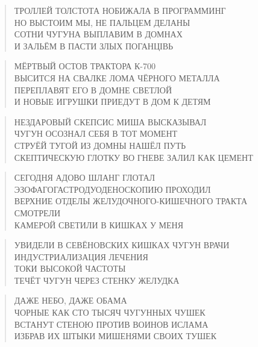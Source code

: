 \poemtitle{***}
\begin{verse}
ТРОЛЛЕЙ ТОЛСТОТА НОБИЖАЛА В ПРОГРАММИНГ\\
НО ВЫСТОИМ МЫ, НЕ ПАЛЬЦЕМ ДЕЛАНЫ\\
СОТНИ ЧУГУНА ВЫПЛАВИМ В ДОМНАХ\\
И ЗАЛЬЁМ В ПАСТИ ЗЛЫХ ПОГАНЦІВЬ
\end{verse}

\poemtitle{***}
\begin{verse}
МЁРТВЫЙ ОСТОВ ТРАКТОРА К-700\\
ВЫСИТСЯ НА СВАЛКЕ ЛОМА ЧЁРНОГО МЕТАЛЛА\\
ПЕРЕПЛАВЯТ ЕГО В ДОМНЕ СВЕТЛОЙ\\
И НОВЫЕ ИГРУШКИ ПРИЕДУТ В ДОМ К ДЕТЯМ
\end{verse}

\poemtitle{***}
\begin{verse}
НЕЗДАРОВЫЙ СКЕПСИС МИША ВЫСКАЗЫВАЛ\\
ЧУГУН ОСОЗНАЛ СЕБЯ В ТОТ МОМЕНТ\\
СТРУЁЙ ТУГОЙ ИЗ ДОМНЫ НАШЁЛ ПУТЬ\\
СКЕПТИЧЕСКУЮ ГЛОТКУ ВО ГНЕВЕ ЗАЛИЛ КАК ЦЕМЕНТ
\end{verse}

\poemtitle{***}
\begin{verse}
СЕГОДНЯ АДОВО ШЛАНГ ГЛОТАЛ\\
ЭЗОФАГОГАСТРОДУОДЕНОСКОПИЮ ПРОХОДИЛ\\
ВЕРХНИЕ ОТДЕЛЫ ЖЕЛУДОЧНОГО-КИШЕЧНОГО ТРАКТА СМОТРЕЛИ\\
КАМЕРОЙ СВЕТИЛИ В КИШКАХ У МЕНЯ
\end{verse}

\poemtitle{***}
\begin{verse}
УВИДЕЛИ В СЕВЁНОВСКИХ КИШКАХ ЧУГУН ВРАЧИ\\
ИНДУСТРИАЛИЗАЦИЯ ЛЕЧЕНИЯ\\
ТОКИ ВЫСОКОЙ ЧАСТОТЫ\\
ТЕЧЁТ ЧУГУН ЧЕРЕЗ СТЕНКУ ЖЕЛУДКА
\end{verse}

\poemtitle{***}
\begin{verse}
ДАЖЕ НЕБО, ДАЖЕ ОБАМА\\
ЧОРНЫЕ КАК СТО ТЫСЯЧ ЧУГУННЫХ ЧУШЕК\\
ВСТАНУТ СТЕНОЮ ПРОТИВ ВОИНОВ ИСЛАМА\\
ИЗБРАВ ИХ ШТЫКИ МИШЕНЯМИ СВОИХ ТУШЕК
\end{verse}

